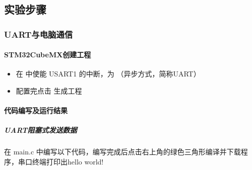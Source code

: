 \documentclass[a4paper,12pt,english]{sphinxmanual}
\begin{document}
\subsection{实验步骤}
\label{\detokenize{exp-stm32/peripherals-and-sensors:id7}}

\subsubsection{UART与电脑通信}
\label{\detokenize{exp-stm32/peripherals-and-sensors:uart}}

\paragraph{STM32CubeMX创建工程}
\label{\detokenize{exp-stm32/peripherals-and-sensors:stm32cubemx}}\begin{itemize}
\item {} 
\sphinxAtStartPar
在  中使能 USART1 的中断，为 （异步方式，简称UART）

\end{itemize}

\sphinxAtStartPar
{}
\begin{itemize}
\item {} 
\sphinxAtStartPar
配置完点击  生成工程

\end{itemize}

\sphinxAtStartPar
{}


\paragraph{代码编写及运行结果}
\label{\detokenize{exp-stm32/peripherals-and-sensors:id8}}

\subparagraph{UART阻塞式发送数据}
\label{\detokenize{exp-stm32/peripherals-and-sensors:id9}}
\sphinxAtStartPar
在 main.c 中编写以下代码，编写完成后点击右上角的绿色三角形编译并下载程序，串口终端打印出hello world!

\sphinxAtStartPar
{}
\end{document}
